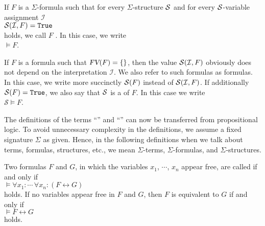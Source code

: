 \begin{Definition} 
    If $F$ is a $\Sigma$-formula such that for every $\Sigma$-structure $\mathcal{S}$ and for every
    $\mathcal{S}$-variable assignment $\mathcal{I}$ \\[0.2cm]
    \hspace*{1.3cm} $\mathcal{S}(\mathcal{I}, F) = \mathtt{True}$ \\[0.2cm]
    holds, we call $F$ . In this case, we write \\[0.2cm]
    \hspace*{1.3cm} $\models F$. 
    \eox
\end{Definition}

If $F$ is a formula such that $\textsl{FV}(F) = \{\}$, then the value $\mathcal{S}(\mathcal{I}, F)$ 
obviously does not depend on the interpretation $\mathcal{I}$. We also refer to such formulas as 
 formulas. In this case, we write more succinctly $\mathcal{S}(F)$
instead of $\mathcal{S}(\mathcal{I}, F)$. If additionally $\mathcal{S}(F) = \mathtt{True}$, 
we also say that $\mathcal{S}$ is a   of $F$.
In this case we write \\[0.2cm]
\hspace*{1.3cm} $\mathcal{S} \models F$. 
\vspace{0.1cm}

The definitions of the terms ``'' and
``'' can now be transferred from propositional logic. 
To avoid unnecessary complexity in the definitions, we assume a
fixed signature $\Sigma$ as given. Hence, in the following definitions
when we talk about terms, formulas, structures, etc., we mean $\Sigma$-terms,
$\Sigma$-formulas, and $\Sigma$-structures.

\begin{Definition}[Equivalent] 
  Two formulas $F$ and $G$, in which the variables $x_1$, $\cdots$, $x_n$ appear free, are called
   if and only if  
  \\[0.2cm] 
  \hspace*{1.3cm}
  $\models \forall x_1: \cdots\, \forall x_n: (F \leftrightarrow G)$
  \\[0.2cm] 
  holds. If no variables appear free in $F$ and $G$, then $F$ is equivalent to $G$ if and only if
  \\[0.2cm]
  \hspace*{1.3cm}
  $\models F \leftrightarrow G$
  \\[0.2cm]
  holds.
  \eox
\end{Definition}


